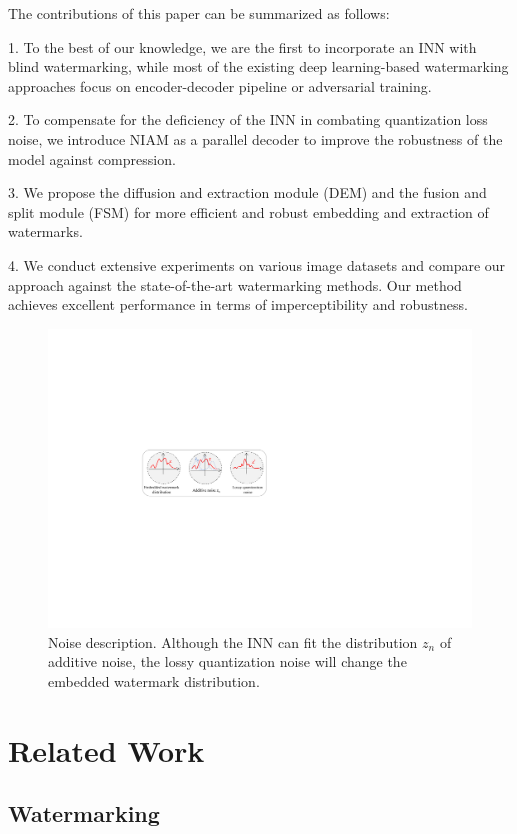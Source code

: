 \documentclass[sigconf]{acmart}
\begin{document}
The contributions of this paper can be summarized as follows:

1. To the best of our knowledge, we are the first to incorporate an INN with blind watermarking, while most of the existing deep learning-based watermarking approaches focus on encoder-decoder pipeline or adversarial training. 

2. To compensate for the deficiency of the INN in combating quantization loss noise, we introduce NIAM as a parallel decoder to improve the robustness of the model against compression.

3. We propose the diffusion and extraction module (DEM) and the fusion and split module (FSM) for more efficient and robust embedding and extraction of watermarks.

4. We conduct extensive experiments on various image datasets and compare our approach against the state-of-the-art watermarking methods. Our method achieves excellent performance in terms of imperceptibility and robustness.



\begin{figure}[]
	\centering
	\includegraphics[width=0.6\linewidth]{picture/distribution.pdf}
	\caption{Noise description. Although the INN can fit the distribution $z_{n}$ of additive noise, the lossy quantization noise will change the embedded watermark distribution.}
	\label{fig:distri}
\end{figure}




\section{Related Work}

\subsection{Watermarking}
\end{document}
